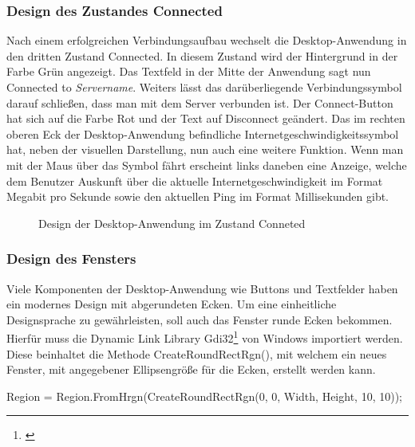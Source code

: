 \subsubsection{Design des Zustandes Connected}

Nach einem erfolgreichen Verbindungsaufbau wechselt die Desktop-Anwendung in den dritten Zustand Connected. In diesem Zustand wird der Hintergrund in der Farbe Grün angezeigt. Das Textfeld in der Mitte der Anwendung sagt nun Connected to \textit{Servername}. Weiters lässt das darüberliegende Verbindungssymbol darauf schließen, dass man mit dem Server verbunden ist. Der Connect-Button hat sich auf die Farbe Rot und der Text auf Disconnect geändert. Das im rechten oberen Eck der Desktop-Anwendung befindliche Internetgeschwindigkeitssymbol hat, neben der visuellen Darstellung, nun auch eine weitere Funktion. Wenn man mit der Maus über das Symbol fährt erscheint links daneben eine Anzeige, welche dem Benutzer Auskunft über die aktuelle Internetgeschwindigkeit im Format Megabit pro Sekunde sowie den aktuellen Ping im Format Millisekunden gibt.
\\
\begin{figure}[H]
    \centering
    \setlength{\fboxsep}{1pt}
	\setlength{\fboxrule}{1pt}
    \caption[Design der Desktop-Anwendung im Zustand Conneted]{Design der Desktop-Anwendung im Zustand Conneted} 
\end{figure}

\subsubsection{Design des Fensters}

Viele Komponenten der Desktop-Anwendung wie Buttons und Textfelder haben ein modernes Design mit abgerundeten Ecken. Um eine einheitliche Designsprache zu gewährleisten, soll auch das Fenster runde Ecken bekommen. Hierfür muss die Dynamic Link Library Gdi32\footnote[1]{\cite[Vgl.][]{GDI}} von Windows importiert werden. Diese beinhaltet die Methode \mbox{CreateRoundRectRgn()}, mit welchem ein neues Fenster, mit angegebener Ellipsengröße für die Ecken, erstellt werden kann.

\begin{program}[H]
\begin{CSharpCode}
Region = Region.FromHrgn(CreateRoundRectRgn(0, 0, Width, Height, 10, 10));
\end{CSharpCode}
\caption{Erstellen eines neuen Fensters mit abgerundeten Ecken}
\end{program}


